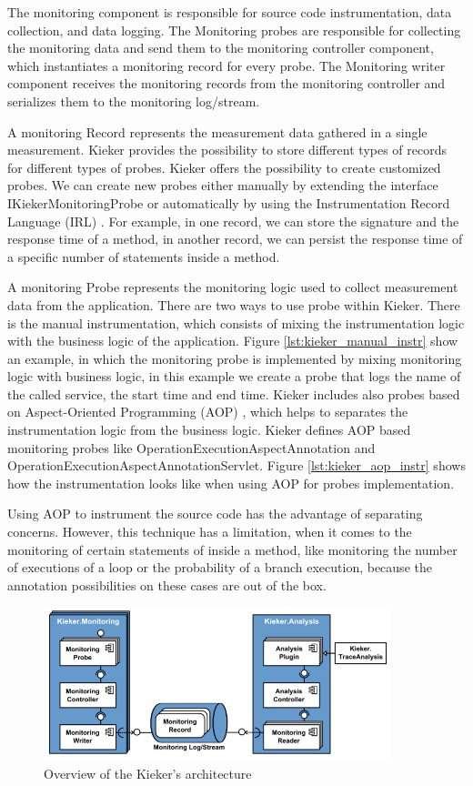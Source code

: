 The monitoring component is responsible for source code instrumentation, data collection, and data logging. The Monitoring probes are responsible for collecting the monitoring data and send them to the monitoring controller component, which instantiates a monitoring record for every probe. The Monitoring writer component receives the monitoring records from the monitoring controller and serializes them to the monitoring log/stream. 

A monitoring Record represents the measurement data gathered in a single measurement. Kieker provides the possibility to store different types of records for different types of probes. Kieker offers the possibility to create customized probes. We can create new probes either manually by extending the interface IKiekerMonitoringProbe or automatically by using the Instrumentation Record Language (IRL) \cite{jung2013instrumentation}. For example, in one record, we can store the signature and the response time of a method, in another record, we can persist the response time of a specific number of statements inside a method.

A monitoring Probe represents the monitoring logic used to collect measurement data from the application. There are two ways to use probe within Kieker.  There is the manual instrumentation, which consists of mixing the instrumentation logic with the business logic of the application. Figure \ref{lst:kieker_manual_instr} show an example, in which the monitoring probe is implemented by mixing monitoring logic with business logic, in this example we create a probe that logs the name of the called service, the start time and end time. Kieker includes also probes based on Aspect-Oriented Programming (AOP) \cite{kiczales1997j}, which helps to separates the instrumentation logic from the business logic. Kieker defines AOP based monitoring probes like OperationExecutionAspectAnnotation and OperationExecutionAspectAnnotationServlet. Figure \ref{lst:kieker_aop_instr} shows how the instrumentation looks like when using AOP for probes implementation.

Using AOP to instrument the source code has the advantage of separating concerns. However, this technique has a limitation, when it comes to the monitoring of certain statements of inside a method, like monitoring the number of executions of a loop or the probability of a branch execution, because the annotation possibilities on these cases are out of the box. 


\begin{figure}[h]
\centering
\includegraphics[width=0.9\textwidth]{figures/kieker}
\caption{Overview of the Kieker's architecture \cite{van2009continuous}}
\label{fig:kieker}
\end{figure}

